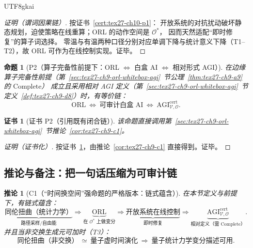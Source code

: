 \documentclass[12pt]{article}
\newtheorem{proposition}{命题}[section]
\newtheorem{corollary}{推论}[section]
\newtheorem{Certificate}{证书}[section]
\begin{document}
\begin{CJK*}{UTF8}{gkai}
\begin{proof}[证明（谓词因果链）]
按证书~\ref{cert:tex27-ch10-p1}：
开放系统的对抗扰动破坏静态规划，迫使策略在线重算；ORL 的动作空间是 $\mathcal{O}^*$，
因而天然适配“即时修复”的算子词选择。
零温与有温两种口径分别对应单调下降与统计意义下降（T1--T2），故 ORL 可作为在线控制实现。证毕。
\end{proof}

\begin{proposition}[P2（算子完备性前提下：ORL $\Longleftrightarrow$ 白盒 AI $\Longleftrightarrow$ 相对形式 AGI）]
\label{prop:tex27-ch10-p2}
在边缘算子完备性前提（第~\ref{sec:tex27-ch9-orl-whitebox-agi}~节公理~\ref{thm:tex27-ch9-a9} 的 $\mathrm{Complete}$）
成立且采用相对 AGI 定义（第~\ref{sec:tex27-ch9-orl-whitebox-agi}~节定义~\ref{def:tex27-ch9-d8}）时，有等价链：
\[
  \mathrm{ORL}\ \Longleftrightarrow\ \text{可审计白盒 AI}\ \Longleftrightarrow\ \mathrm{AGI}^{\mathrm{cert}}_{\mathcal{V},
    \mathcal{O}}.
\]
\end{proposition}

\begin{Certificate}[证书 P2（引用既有闭合链）]
\label{cert:tex27-ch10-p2}
该命题直接调用第~\ref{sec:tex27-ch9-orl-whitebox-agi}~节推论~\ref{cor:tex27-ch9-c1}。
\end{Certificate}

\begin{proof}[证明（证书化）]
按证书~\ref{cert:tex27-ch10-p2}，由推论~\ref{cor:tex27-ch9-c1} 直接得到。证毕。
\end{proof}

\subsection{推论与备注：把一句话压缩为可审计链}
\label{subsec:tex27-ch10-others}

\begin{corollary}[C1（“时间换空间”强命题的严格版本：链式蕴含）]
\label{cor:tex27-ch10-c1}
在本节定义与前提下，有链式蕴含：
\[
  \underbrace{\text{同伦扭曲（统计力学）}}_{\text{路径采样/自由能}}
  \Longrightarrow
  \underbrace{\text{ORL}}_{\text{在 }\mathcal{O}^*\text{ 上做变分}}
  \Longrightarrow
  \underbrace{\text{开放系统在线控制}}_{\text{即时修复}}
  \Longrightarrow
  \underbrace{\mathrm{AGI}^{\mathrm{cert}}_{\mathcal{V},\mathcal{O}}}_{\text{相对定义（需 }\mathrm{Complete}\text{）}}.
\]
并且当非交换生成元可加时（T3）：
\[
  \text{同伦扭曲（非交换）}\ \simeq\ \text{量子虚时间演化}\ \Rightarrow\ \text{量子统计力学变分描述可用}.
\]
\end{corollary}


\end{CJK*}
\end{document}
